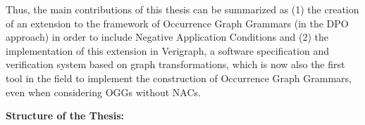 
Thus, the main contributions of this thesis can be summarized as (1) the creation of an extension  to the framework of Occurrence Graph Grammars (in the DPO approach) in order to include Negative Application Conditions and (2) the implementation of this extension in Verigraph, a software specification and verification system based on graph transformations, which is now also the first tool in the field to implement the construction of Occurrence Graph Grammars, even when considering OGGs without NACs.

\hfill \break
\textbf{Structure of the Thesis:}

